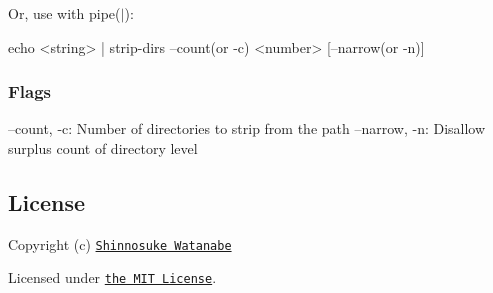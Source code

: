 Or, use with pipe({\ttfamily $\vert$})\+:


\begin{DoxyCode}
echo <string> | strip-dirs --count(or -c) <number> [--narrow(or -n)]
\end{DoxyCode}


\subsubsection*{Flags}


\begin{DoxyCode}
--count,  -c: Number of directories to strip from the path
--narrow, -n: Disallow surplus count of directory level
\end{DoxyCode}


\subsection*{License}

Copyright (c) \href{https://github.com/shinnn}{\tt Shinnosuke Watanabe}

Licensed under \href{./LICENSE}{\tt the M\+IT License}. 